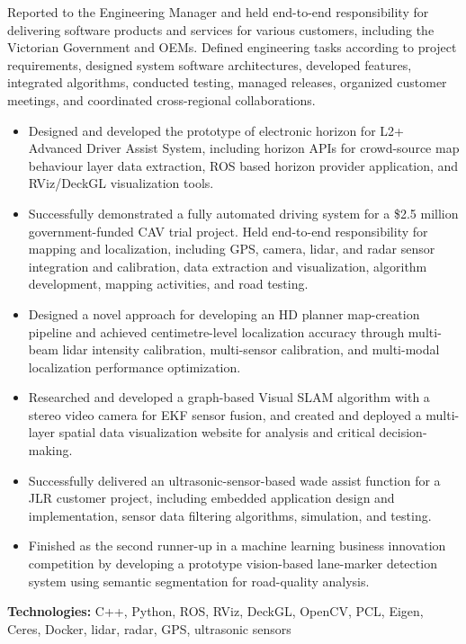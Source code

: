 \documentclass[letterpaper,11pt]{article}
\newcommand{\resumeSubHeadingListStart}{\begin{itemize}[leftmargin=*]}
\newcommand{\resumeSubHeadingListEnd}{\end{itemize}}
\begin{document}
\vspace{10pt}
{Reported to the Engineering Manager and held end-to-end responsibility for delivering software products and services for various customers, including the Victorian Government and OEMs. Defined engineering tasks according to project requirements, designed system software architectures, developed features, integrated algorithms, conducted testing, managed releases, organized customer meetings, and coordinated cross-regional collaborations.}
  \resumeSubHeadingListStart
    \item Designed and developed the prototype of electronic horizon for L2+ Advanced Driver Assist System, including horizon APIs for crowd-source map behaviour layer data extraction, ROS based horizon provider application, and RViz/DeckGL visualization tools.
    \item Successfully demonstrated a fully automated driving system for a \$2.5 million government-funded CAV trial project. Held end-to-end responsibility for mapping and localization, including GPS, camera, lidar, and radar sensor integration and calibration, data extraction and visualization, algorithm development, mapping activities, and road testing.
    \item Designed a novel approach for developing an HD planner map-creation pipeline and achieved centimetre-level localization accuracy through multi-beam lidar intensity calibration, multi-sensor calibration, and multi-modal localization performance optimization.
    \item Researched and developed a graph-based Visual SLAM algorithm with a stereo video camera for EKF sensor fusion, and created and deployed a multi-layer spatial data visualization website for analysis and critical decision-making.
    \item Successfully delivered an ultrasonic-sensor-based wade assist function for a JLR customer project, including embedded application design and implementation, sensor data filtering algorithms, simulation, and testing.
    \item Finished as the second runner-up in a machine learning business innovation competition by developing a prototype vision-based lane-marker detection system using semantic segmentation for road-quality analysis.
  \resumeSubHeadingListEnd
  \vspace{2pt}
  {\small \textbf{Technologies:} C++, Python, ROS, RViz, DeckGL, OpenCV, PCL, Eigen, Ceres, Docker, lidar, radar, GPS, ultrasonic sensors}
\end{document}
